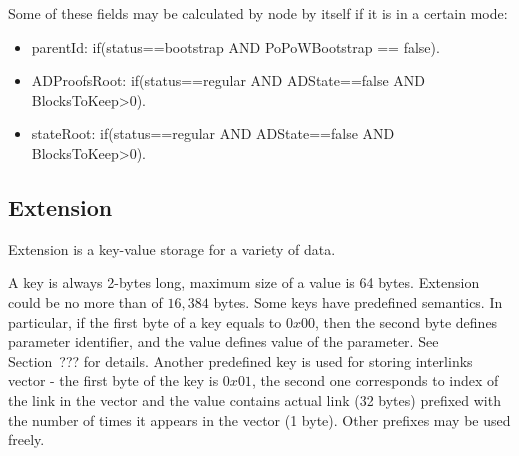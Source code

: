 \vspace{1em}
Some of these fields may be calculated by node by itself if it is in a certain mode:

\begin{itemize}
    \item parentId: if(status==bootstrap AND PoPoWBootstrap == false).
    \item ADProofsRoot: if(status==regular AND ADState==false AND BlocksToKeep>0).
    \item stateRoot: if(status==regular AND ADState==false AND BlocksToKeep>0).
\end{itemize}

\subsection{Extension}
\label{sec:extension}

Extension is a key-value storage for a variety of data.

A key is always 2-bytes long, maximum size of a value is 64 bytes. Extension could be no more than of $16,384$ bytes.
Some keys have predefined semantics. In particular, if the first byte of a key equals to $0x00$, then the second byte
defines parameter identifier, and the value defines value of the parameter. See Section~???
for details. Another predefined key is used for storing interlinks vector - the first byte of the key is $0x01$,
the second one corresponds to index of the link in the vector and the value contains actual link (32 bytes) prefixed
with the number of times it appears in the vector (1 byte). Other prefixes may be used freely.



